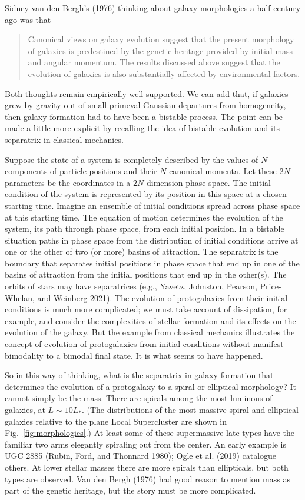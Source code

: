 \documentclass[fleqn,usenatbib]{mnras}
\begin{document}
Sidney van den Bergh's (1976) thinking about galaxy morphologies a half-century ago was that 
\begin{quotation}\noindent
\noindent Canonical views on galaxy evolution suggest that the present morphology of galaxies is predestined by the genetic heritage provided by initial mass and angular momentum. The results discussed above suggest that the evolution of galaxies is also substantially affected by environmental factors.
\end{quotation}
Both thoughts remain empirically well supported. We can add that, if galaxies grew by gravity out of small primeval Gaussian departures from homogeneity, then galaxy formation had to have been a bistable process. The point can be made a little more explicit by recalling the idea of bistable evolution and its separatrix in classical mechanics.

Suppose the state of a system is completely described by the values of $N$ components of particle positions and their $N$ canonical momenta. Let these $2N$ parameters be the coordinates in a $2N$ dimension phase space. The initial condition of the system is represented by its position in this space at a chosen starting time. Imagine an ensemble of initial conditions spread across phase space at this starting time. The equation of motion determines the evolution of the system, its path through phase space, from each initial position. In a bistable situation paths in phase space from the distribution of initial conditions arrive at one or the other of two (or more) basins of attraction. The separatrix is the boundary that separates initial positions in phase space that end up in one of the basins of attraction from the initial positions that end up in the other(s). The orbits of stars may have separatrices (e.g., Yavetz, Johnston, Pearson, Price-Whelan, and Weinberg 2021). The evolution of protogalaxies from their initial conditions is much more complicated; we must take account of dissipation, for example, and consider the complexities of stellar formation and its effects on the evolution of the galaxy. But the example from classical mechanics illustrates the concept of evolution of protogalaxies from initial conditions without manifest bimodality to a bimodal final state. It is what seems to have happened.

So in this way of thinking, what is the separatrix in galaxy formation that determines the evolution of a protogalaxy to a spiral or elliptical morphology? It cannot simply be the mass. There are spirals among the most luminous of galaxies, at $L \sim 10L_\ast$. (The distributions of the most massive spiral and elliptical galaxies relative to the plane Local Supercluster are shown in Fig.~\ref{fig:morphologies}.) At least some of these supermassive late types have the familiar two arms elegantly spiraling out from the center. An early example is UGC 2885 (Rubin, Ford, and Thonnard 1980); Ogle et al. (2019) catalogue others.  At lower stellar masses there are more spirals than ellipticals, but both types are observed. Van den Bergh (1976) had good reason to mention mass as part of the genetic heritage, but the story must be more complicated.
\end{document}
